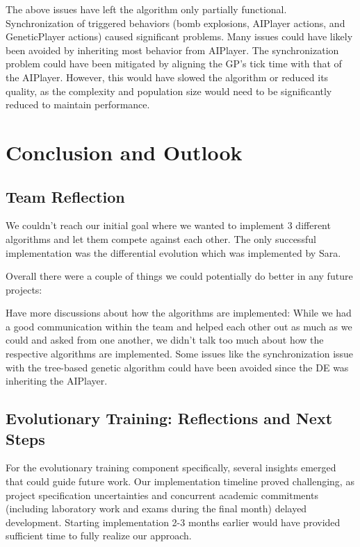\documentclass[sigconf]{acmart} %
\begin{document}
\begin{enumerate}
   The above issues have left the algorithm only partially functional. Synchronization of triggered behaviors (bomb explosions, AIPlayer actions, and GeneticPlayer actions) caused significant problems. Many issues could have likely been avoided by inheriting most behavior from AIPlayer. The synchronization problem could have been mitigated by aligning the GP's tick time with that of the AIPlayer. However, this would have slowed the algorithm or reduced its quality, as the complexity and population size would need to be significantly reduced to maintain performance. 
\end{enumerate}

\section{Conclusion and Outlook}

\subsection{Team Reflection}
We couldn’t reach our initial goal where we wanted to implement 3 different algorithms and let them compete against each other. The only successful implementation was the differential evolution which was implemented by Sara.

Overall there were a couple of things we could potentially do better in any future projects:

Have more discussions about how the algorithms are implemented: While we had a good communication within the team and helped each other out as much as we could and asked from one another, we didn’t talk too much about how the respective algorithms are implemented. Some issues like the synchronization issue with the tree-based genetic algorithm could have been avoided since the DE was inheriting the AIPlayer.

\subsection{Evolutionary Training: Reflections and Next Steps}
For the evolutionary training component specifically, several insights emerged that could guide future work. Our implementation timeline proved challenging, as project specification uncertainties and concurrent academic commitments (including laboratory work and exams during the final month) delayed development. Starting implementation 2-3 months earlier would have provided sufficient time to fully realize our approach.
\end{document}
